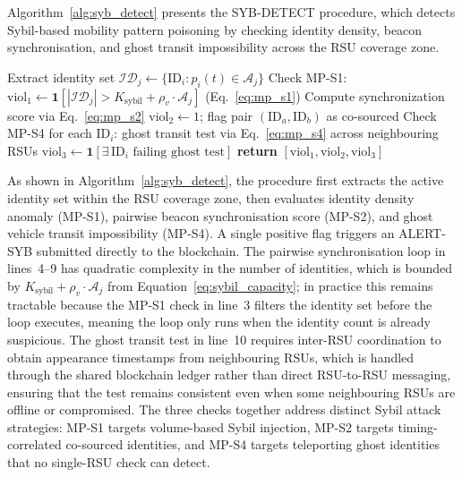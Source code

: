 \documentclass[12pt, a4paper]{report}
\begin{document}
Algorithm~\ref{alg:syb_detect} presents the SYB-DETECT procedure,
which detects Sybil-based mobility pattern poisoning by checking
identity density, beacon synchronisation, and ghost transit
impossibility across the RSU coverage zone.

\begin{algorithm}[H]
\caption{Sybil-Based Mobility Pattern Poisoning Detection (\texttt{SYB-DETECT})}
\begin{algorithmic}[1]
  \small
  \State Extract identity set $\mathcal{ID}_j \gets
    \{\mathrm{ID}_i : p_i(t) \in \mathcal{A}_j\}$
  \State Check MP-S1: $\mathrm{viol}_1 \gets
    \mathbf{1}\!\left[|\mathcal{ID}_j| > K_{\mathrm{sybil}}
    + \rho_v \cdot \mathcal{A}_j\right]$
    \quad (Eq.~\eqref{eq:mp_s1})
    \State Compute synchronization score via Eq.~\eqref{eq:mp_s2}
      \State $\mathrm{viol}_2 \gets 1$;
             flag pair $(\mathrm{ID}_a, \mathrm{ID}_b)$ as co-sourced
    \EndIf
  \EndFor
  \State Check MP-S4 for each $\mathrm{ID}_i$: ghost transit test
         via Eq.~\eqref{eq:mp_s4} across neighbouring RSUs
  \State $\mathrm{viol}_3 \gets \mathbf{1}\!\left[\exists\, \mathrm{ID}_i
    \text{ failing ghost test}\right]$
\State \textbf{return}
    $[\mathrm{viol}_1,\mathrm{viol}_2,\mathrm{viol}_3]$
  \EndProcedure
\end{algorithmic}
\label{alg:syb_detect}
\end{algorithm}

As shown in Algorithm~\ref{alg:syb_detect}, the procedure first
extracts the active identity set within the RSU coverage zone, then
evaluates identity density anomaly (MP-S1), pairwise beacon
synchronisation score (MP-S2), and ghost vehicle transit impossibility
(MP-S4). A single positive flag triggers an ALERT-SYB submitted
directly to the blockchain. The pairwise synchronisation loop in
lines~4--9 has quadratic complexity in the number of identities, which
is bounded by $K_{\mathrm{sybil}} + \rho_v \cdot \mathcal{A}_j$ from
Equation~\ref{eq:sybil_capacity}; in practice this remains tractable
because the MP-S1 check in line~3 filters the identity set before the
loop executes, meaning the loop only runs when the identity count is
already suspicious. The ghost transit test in line~10 requires
inter-RSU coordination to obtain appearance timestamps from
neighbouring RSUs, which is handled through the shared blockchain
ledger rather than direct RSU-to-RSU messaging, ensuring that the
test remains consistent even when some neighbouring RSUs are offline
or compromised. The three checks together address distinct Sybil
attack strategies: MP-S1 targets volume-based Sybil injection, MP-S2
targets timing-correlated co-sourced identities, and MP-S4 targets
teleporting ghost identities that no single-RSU check can detect.
\end{document}
